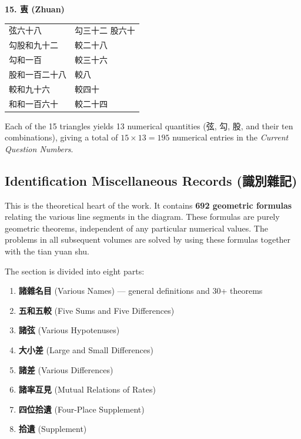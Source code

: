 \documentclass[11pt,a4paper]{article}
\begin{document}
\textbf{15. 叀 (Zhuan)}

\begin{center}
\begin{tabular}{ll}
弦六十八 & 勾三十二 \quad 股六十 \\
勾股和九十二 & 較二十八 \\
勾和一百 & 較三十六 \\
股和一百二十八 & 較八 \\
較和九十六 & 較四十 \\
和和一百六十 & 較二十四 \\
\end{tabular}
\end{center}

\vspace{0.3cm}

Each of the 15 triangles yields 13 numerical quantities (弦, 勾, 股, and their ten combinations), giving a total of $15 \times 13 = 195$ numerical entries in the \textit{Current Question Numbers}.

\subsection{Identification Miscellaneous Records (識別雜記)}
\label{subsec:identification}

This is the theoretical heart of the work. It contains \textbf{692 geometric formulas} relating the various line segments in the diagram. These formulas are purely geometric theorems, independent of any particular numerical values. The problems in all subsequent volumes are solved by using these formulas together with the tian yuan shu.

The section is divided into eight parts:

\begin{enumerate}[leftmargin=2em]
  \item \textbf{諸雜名目} (Various Names) --- general definitions and 30+ theorems
  \item \textbf{五和五較} (Five Sums and Five Differences)
  \item \textbf{諸弦} (Various Hypotenuses)
  \item \textbf{大小差} (Large and Small Differences)
  \item \textbf{諸差} (Various Differences)
  \item \textbf{諸率互見} (Mutual Relations of Rates)
  \item \textbf{四位拾遺} (Four-Place Supplement)
  \item \textbf{拾遺} (Supplement)
\end{enumerate}
\end{document}
